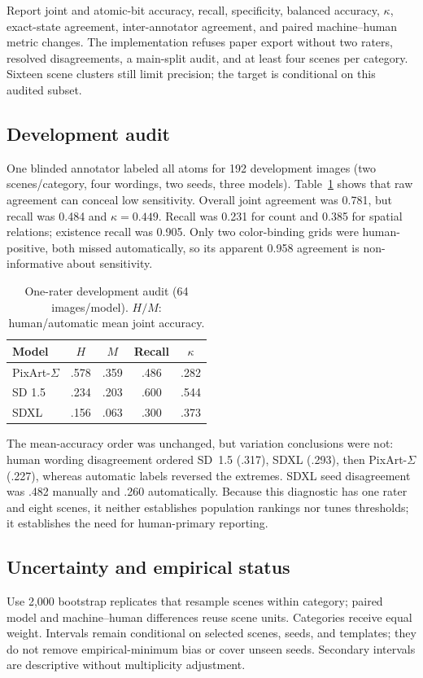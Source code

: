 \documentclass[10pt,letterpaper]{article}
\begin{document}
Report joint and atomic-bit accuracy, recall, specificity, balanced accuracy, $\kappa$, exact-state agreement, inter-annotator agreement, and paired machine--human metric changes. The implementation refuses paper export without two raters, resolved disagreements, a main-split audit, and at least four scenes per category. Sixteen scene clusters still limit precision; the target is conditional on this audited subset.

\subsection{Development audit}
One blinded annotator labeled all atoms for 192 development images (two scenes/category, four wordings, two seeds, three models). Table~\ref{tab:dev} shows that raw agreement can conceal low sensitivity. Overall joint agreement was 0.781, but recall was 0.484 and $\kappa=0.449$. Recall was 0.231 for count and 0.385 for spatial relations; existence recall was 0.905. Only two color-binding grids were human-positive, both missed automatically, so its apparent 0.958 agreement is non-informative about sensitivity.

\begin{table}[t]
\centering\caption{One-rater development audit (64 images/model). $H/M$: human/automatic mean joint accuracy.}\label{tab:dev}
\begin{tabular}{@{}lcccc@{}}\toprule
Model & $H$ & $M$ & Recall & $\kappa$\\\midrule
PixArt-$\Sigma$ & .578 & .359 & .486 & .282\\
SD 1.5 & .234 & .203 & .600 & .544\\
SDXL & .156 & .063 & .300 & .373\\\bottomrule
\end{tabular}
\end{table}

The mean-accuracy order was unchanged, but variation conclusions were not: human wording disagreement ordered SD~1.5 (.317), SDXL (.293), then PixArt-$\Sigma$ (.227), whereas automatic labels reversed the extremes. SDXL seed disagreement was .482 manually and .260 automatically. Because this diagnostic has one rater and eight scenes, it neither establishes population rankings nor tunes thresholds; it establishes the need for human-primary reporting.

\subsection{Uncertainty and empirical status}
Use 2,000 bootstrap replicates that resample scenes within category; paired model and machine--human differences reuse scene units. Categories receive equal weight. Intervals remain conditional on selected scenes, seeds, and templates; they do not remove empirical-minimum bias or cover unseen seeds. Secondary intervals are descriptive without multiplicity adjustment.
\end{document}
